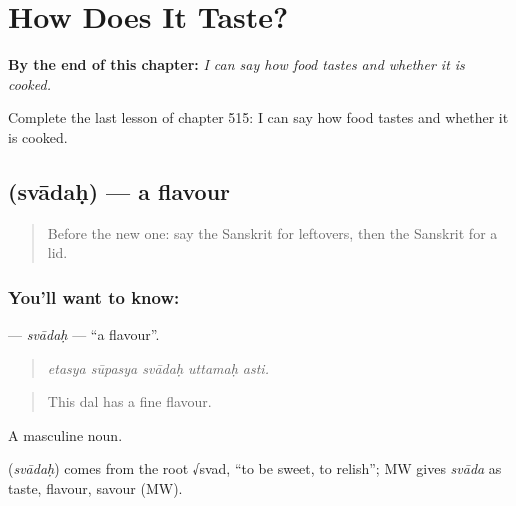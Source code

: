 
\chapter{How Does It Taste?}
\label{ch:sa-how-does-it-taste}

\begin{chapteropening}
\textbf{By the end of this chapter:} \emph{I can say how food tastes and whether it is cooked.}

Complete the last lesson of chapter 515: I can say how food tastes and whether it is cooked.
\end{chapteropening}

\section[\texorpdfstring{\sk{स्वादः} (svādaḥ)}{स्वादः (svādaḥ)}]{ (svādaḥ) — a flavour}

\label{lesson:SA-C515-svadah}



\begin{quote}
Before the new one: say the Sanskrit for leftovers, then the Sanskrit for a lid.
\end{quote}

\subsection*{You'll want to know: }
\textbf{} — \emph{svādaḥ} — \textquotedblleft{}a flavour\textquotedblright{}.

\begin{quote}
    
\end{quote}

\begin{quote}
\emph{etasya sūpasya svādaḥ uttamaḥ asti.}
\end{quote}

\begin{quote}
This dal has a fine flavour.
\end{quote}

A masculine noun.

\begin{cousinweb}
\textbf{} (\emph{svādaḥ}) comes from the root √svad, \textquotedblleft{}to be sweet, to relish\textquotedblright{}; MW gives \emph{svāda} as taste, flavour, savour (MW).
\end{cousinweb}

